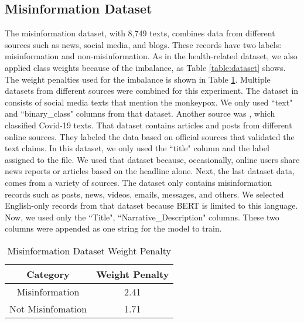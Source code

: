 \subsection{Misinformation Dataset}
The misinformation dataset, with 8,749 texts, combines data from different sources such as news, social media, and blogs. These records have two labels: misinformation and non-misinformation. As in the health-related dataset, we also applied class weights because of the imbalance, as Table \ref{table:dataset} shows. The weight penalties used for the imbalance is shown in Table \ref{table:misinformationweight}. Multiple datasets from different sources were combined for this experiment. The dataset in \cite{stephencrone2022} consists of social media texts that mention the monkeypox. We only used ``text" and ``binary\_class" columns from that dataset. Another source was \cite{coviddata}, which classified Covid-19 texts. That dataset contains articles and posts from different online sources. They labeled the data based on official sources that validated the text claims. In this dataset, we only used the ``title" column and the label assigned to the file. We used that dataset because, occasionally, online users share news reports or articles based on the headline alone. Next, the last dataset \cite{covidunesco} data, comes from a variety of sources. The dataset only contains misinformation records such as posts, news, videos, emails, messages, and others. We selected English-only records from that dataset because BERT is limited to this language. Now, we used only the ``Title", ``Narrative\_Description" columns. These two columns were appended as one string for the model to train.


\begin{table}[H]
	\centering
	\caption{Misinformation Dataset Weight Penalty}
	\begin{tabular}{||c | c||} 
		\hline
		\textbf{Category} & \textbf{Weight Penalty} \\ [1.5ex] 
		\hline
		Misinformation & 2.41  \\ [1ex]
		\hline
		Not Misinfomation & 1.71  \\[1ex]
		\hline
	\end{tabular}
	\label{table:misinformationweight}
\end{table}


